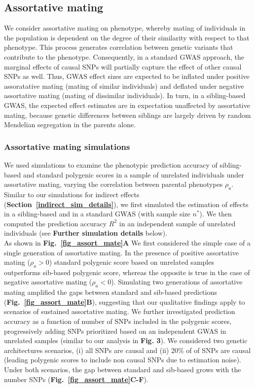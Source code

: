 \documentclass[hidelinks, 12pt]{article}
\begin{document}
\pagebreak

\subsection{Assortative mating}
We consider assortative mating on phenotype, whereby mating of individuals in the population is dependent on the degree of their similarity with respect to that phenotype.  This process generates correlation between genetic variants that contribute to the phenotype.  Consequently, in a standard GWAS approach, the marginal effects of causal SNPs will partially capture the effect of other causal SNPs as well. Thus, GWAS effect sizes are expected to be inflated under positive assoratative mating (mating of similar individuals) and deflated under negative assortative mating (mating of dissimilar individuals). In turn, in a sibling-based GWAS, the expected  effect estimates are in expectation unaffected by assortative mating, because genetic differences between siblings are largely driven by random Mendelian segregation in the parents alone. 

\subsubsection{Assortative mating simulations}
We used simulations to examine the phenotypic prediction accuracy of sibling-based and standard polygenic scores in a sample of unrelated individuals under assortative mating, varying the correlation between parental phenotypes $\rho_a$. Similar to our simulations for indirect effects ({\bf Section~\ref{indirect_sim_details}}), we first simulated the estimation of effects in a sibling-based and in a standard GWAS (with sample size $n^*$). We then computed the prediction accuracy $R^2$ in an independent sample of unrelated individuals (see {\bf Further simulation details} below).\\

As shown in {\bf Fig.~\ref{fig_assort_mate}A} We first considered the simple case of a single generation of assortative mating.  In the presence of positive assortative mating ($\rho_a>0$) standard polygenic score based on unrelated samples outperforms sib-based polygenic score, whereas the opposite is true in the case of negative assortative mating ($\rho_a<0$).  Simulating two generations of assortative mating amplified the gaps between standard and sib-based predictions ({\bf Fig.~\ref{fig_assort_mate}B}), suggesting that our qualitative findings apply to scenarios of sustained assortative mating.  We further investigated prediction accuracy as a function of number of SNPs included in the polygenic scores, progressively adding SNPs prioritized based on an independent GWAS in unrelated samples (similar to our analysis in {\bf Fig. 3}). We considered two genetic architectures scenarios, (i) all SNPs are causal and (ii) 20\% of of SNPs are causal (leading polygenic scores to include non causal SNPs due to estimation noise).  Under both scenarios, the gap between standard and sib-based grows with the number SNPs ({\bf Fig.~\ref{fig_assort_mate}C-F}).\\
\end{document}
